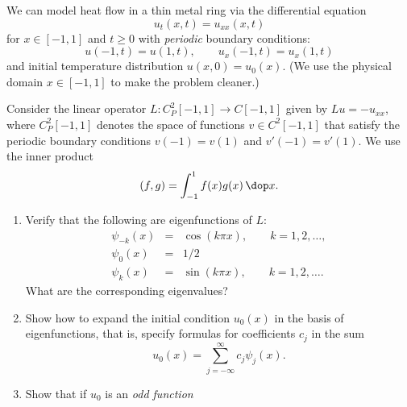 We can model heat flow in a thin metal ring via the differential equation
\[ u_t(x,t) = u_{xx}(x,t)\]
for $x\in[-1,1]$ and $t\ge 0$ with \emph{periodic} boundary conditions:
\[ u(-1,t) = u(1,t), \qquad u_x(-1,t) = u_x(1,t)\]
and initial temperature distribution $u(x,0) = u_0(x)$. 
(We use the physical domain $x\in[-1,1]$ to make the problem cleaner.)

Consider the linear operator $L:C^2_P[-1,1] \to C[-1,1]$
given by $Lu = -u_{xx}$,
where $C^2_P[-1,1]$ denotes the space of functions $v\in C^2[-1,1]$
that satisfy the periodic boundary conditions $v(-1)=v(1)$ and $v'(-1)=v'(1)$.
We use the inner product
\[ (f,g) = \int_{-1}^1 f(x) g(x)\,\dop x.\]

\vspace*{1em}
\begin{enumerate}
\item Verify that the following are eigenfunctions of $L$:
\begin{eqnarray*}
    \psi_{-k}(x) &=& \cos(k \pi x), \qquad {k=1,2,\ldots, }\\[.5em]
    \psi_{0}(x) &=& 1/2 \\[.5em]
    \psi_{k}(x) &=& \sin(k \pi x), \qquad {k=1,2,\ldots. }
\end{eqnarray*}
What are the corresponding eigenvalues?  

\item Show how to expand the initial condition $u_0(x)$ in the basis of
      eigenfunctions, that is, specify formulas for coefficients $c_j$
      in the sum
\[ u_0(x) = \sum_{j=-\infty}^\infty c_j \psi_j(x).\]
    
\item Show that if $u_0$ is an \emph{odd function}

\end{enumerate}


